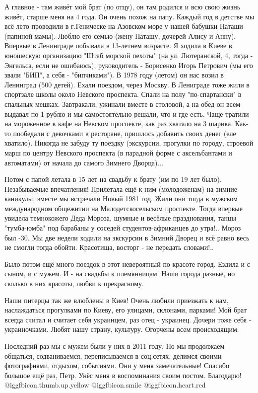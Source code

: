 \begin{itemize}
А главное - там живёт мой брат (по отцу), он там родился и всю свою жизнь
живёт, старше меня на 4 года. Он очень похож на папу. Каждый год в детстве мы
всё лето проводили в г.Геническе на Азовском море у нашей бабушки Наташи
(папиной мамы). Люблю его семью (жену Наташу, дочерей Алису и Анну). Впервые в
Ленинграде побывала в 13-летнем возрасте. Я ходила в Киеве в юношескую
организацию "Штаб морской пехоты" (на ул. Лютеранской, 4, тогда - Энгельса,
если не ошибаюсь), руководитель - Борисенко Игорь Петрович (мы его звали "БИП",
а себя - "бипчиками"). В 1978 году (летом) он нас возил в Ленинград (500
детей). Ехали поездом, через Москву. В Лениграде тоже жили в спортзале школы
около Невского проспекта. Спали на полу "по-спартански" в спальных мешках.
Завтракали, ужинали вместе в столовой, а на обед он всем выдавал по 1 рублю и
мы самостоятельно решали, что и где есть. Чаще тратили на мороженное в кафе на
Невском проспекте, как раз хватало на 3 шарика. Как-то пообедали с девочками в
ресторане, пришлось добавить своих денег (еле хватило).  Никогда не забуду ту
поездку (экскурсии, прогулки по городу, строевой марш по центру Невского
проспекта (в парадной форме с аксельбантами и автоматами) от начала до самого
Зимнего Дворца)... 

Потом с папой летала в 15 лет на свадьбу к
брату (им по 19 лет было). Незабываемые впечатления! Прилетала ещё к ним
(молодоженам) на зимние каникулы, вместе мы встречали Новый 1981 год. Жили они
тогда в мужском международном общежитии на Малодетскосельском проспекте. Тогда
впервые увидела темнокожего Деда Мороза, шумные и весёлые празднования, танцы
"тумба-юмба" под барабаны у соседей студентов-африканцев до утра!.. Мороз был
-30. Мы две недели ходили на экскурсии в Зимний Дворец и всё равно весь не
смогли тогда обойти. Красотища, восторг - не передать словами!.. 

Было потом ещё много поездок в этот невероятный по красоте город. Ездила и с
сыном, и с мужем.  И - на свадьбы к племянницам. Наши города разные, но сколько
в них красоты, любви к прекрасному. 

Наши питерцы так же влюблены в Киев! Очень любили приезжать к нам, наслаждаться
прогулками по Киеву, его улицами, склонами, парками! Мой брат всегда считал и
считает себя украинцем, раз отец - украинец.  Дочери тоже себя - украиночками.
Любят нашу страну, культуру. Огорчены всем происходящим. 

Последний раз мы с мужем были у них в 2011 году. Но мы продолжаем
общаться, содваниваемся, переписываемся в соц.сетях, делимся своими
фотографиями, отдыхом, событиями. Они у меня замечательные! Спасибо большое ещё
раз, Петр. Унёс меня в воспоминания своим постом. Благодарю! @igg{fbicon.thumb.up.yellow}  @igg{fbicon.smile} @igg{fbicon.heart.red}


\end{itemize}
